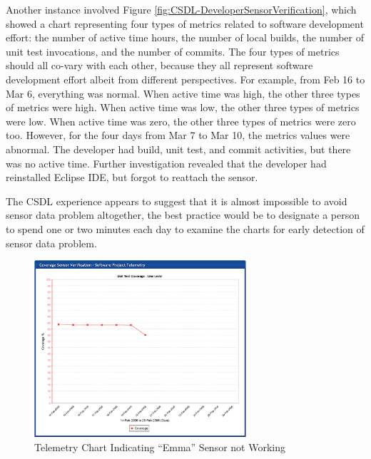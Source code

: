 Another instance involved Figure \ref{fig:CSDL-DeveloperSensorVerification}, which showed a chart representing four types of metrics related to software development effort: the number of active time hours, the number of local builds, the number of unit test invocations, and the number of commits. The four types of metrics should all co-vary with each other, because they all represent software development effort albeit from different perspectives. For example, from Feb 16 to Mar 6, everything was normal. When active time was high, the other three types of metrics were high. When active time was low, the other three types of metrics were low. When active time was zero, the other three types of metrics were zero too. However, for the four days from Mar 7 to Mar 10, the metrics values were abnormal. The developer had build, unit test, and commit activities, but there was no active time. Further investigation revealed that the developer had reinstalled Eclipse IDE, but forgot to reattach the sensor.

The CSDL experience appears to suggest that it is almost impossible to avoid sensor data problem altogether, the best practice would be to designate a person to spend one or two minutes each day to examine the charts for early detection of sensor data problem. 

\begin{figure}[p]
  \center
  \includegraphics[width=0.70\textwidth]{figures/CSDL-CoverageSensorVerification}
  \caption{Telemetry Chart Indicating ``Emma'' Sensor not Working} 
  \label{fig:CSDL-CoverageSensorVerification}
\end{figure}

